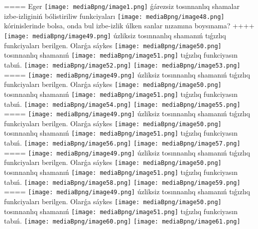 ====
Eger \texttt{[image: mediaBpng/image1.png]} ǵárezsiz tosınnanlıq shamalar izbe-izliginiń bólistiriliw funkciyaları
\texttt{[image: mediaBpng/image48.png]}
kórinislerinde bolsa, onda bul izbe-izlik úlken sanlar nızamına boysınama?
++++
\texttt{[image: mediaBpng/image49.png]} úzliksiz tosınnanlıq shamanıń tıǵızlıq funkciyaları berilgen. Olarǵa sáykes \texttt{[image: mediaBpng/image50.png]} tosınnanlıq shamanıń \texttt{[image: mediaBpng/image51.png]} tıǵızlıq funkciyasın tabıń. \texttt{[image: mediaBpng/image52.png]} \texttt{[image: mediaBpng/image53.png]}
====
\texttt{[image: mediaBpng/image49.png]} úzliksiz tosınnanlıq shamanıń tıǵızlıq funkciyaları berilgen. Olarǵa sáykes \texttt{[image: mediaBpng/image50.png]} tosınnanlıq shamanıń \texttt{[image: mediaBpng/image51.png]} tıǵızlıq funkciyasın tabıń. \texttt{[image: mediaBpng/image54.png]} \texttt{[image: mediaBpng/image55.png]}
====
\texttt{[image: mediaBpng/image49.png]} úzliksiz tosınnanlıq shamanıń tıǵızlıq funkciyaları berilgen. Olarǵa sáykes \texttt{[image: mediaBpng/image50.png]} tosınnanlıq shamanıń \texttt{[image: mediaBpng/image51.png]} tıǵızlıq funkciyasın tabıń. \texttt{[image: mediaBpng/image56.png]} \texttt{[image: mediaBpng/image57.png]}
====
\texttt{[image: mediaBpng/image49.png]} úzliksiz tosınnanlıq shamanıń tıǵızlıq funkciyaları berilgen. Olarǵa sáykes \texttt{[image: mediaBpng/image50.png]} tosınnanlıq shamanıń \texttt{[image: mediaBpng/image51.png]} tıǵızlıq funkciyasın tabıń. \texttt{[image: mediaBpng/image58.png]} \texttt{[image: mediaBpng/image59.png]}
====
\texttt{[image: mediaBpng/image49.png]} úzliksiz tosınnanlıq shamanıń tıǵızlıq funkciyaları berilgen. Olarǵa sáykes \texttt{[image: mediaBpng/image50.png]} tosınnanlıq shamanıń \texttt{[image: mediaBpng/image51.png]} tıǵızlıq funkciyasın tabıń. \texttt{[image: mediaBpng/image60.png]} \texttt{[image: mediaBpng/image61.png]}
